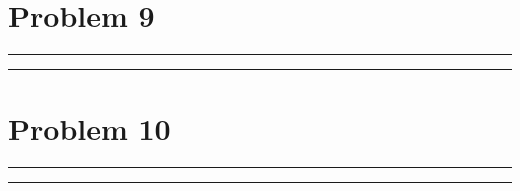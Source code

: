 \documentclass{article}
\theoremstyle{definition}
\newenvironment{solution}{\bigskip\hrule{\hfill}}{\bigskip\hrule{\hfill}} %
\begin{document}

\newpage


\section*{Problem 9}

\begin{solution}


\end{solution}


\newpage


\section*{Problem 10}

\begin{solution}


\end{solution}

\end{document}
